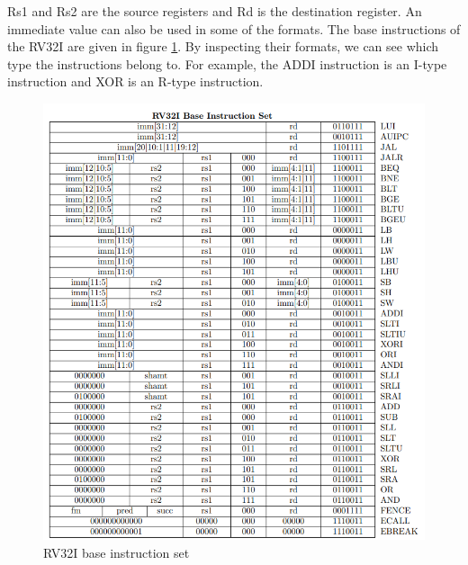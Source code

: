 Rs1 and Rs2 are the source registers and Rd is the destination register. An immediate value can also be used in some of the formats. 
The base instructions of the RV32I are given in figure \ref{fig:rv32i_base_instruction_set}. By inspecting their formats, we can see which type the instructions belong to. For example, the ADDI instruction is an I-type instruction and XOR is an R-type instruction.

\begin{figure}[h!]
    \centering
    \includegraphics{riscv/rv32i_base_instruction_set.png}
    \caption{RV32I base instruction set \cite{rvmanual}}
    \label{fig:rv32i_base_instruction_set}
\end{figure}

